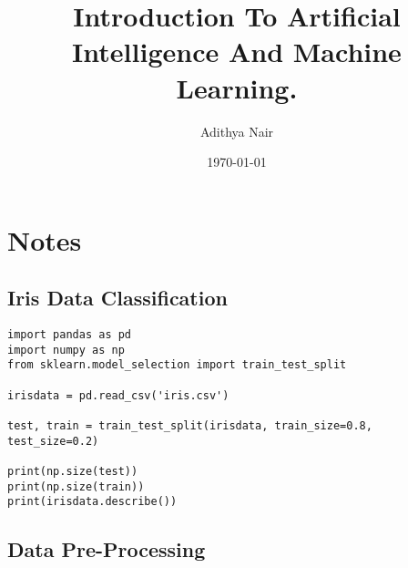 \documentclass[11pt]{article}
\author{Adithya Nair}
\date{\today}
\title{Introduction To Artificial Intelligence And Machine Learning.}
\begin{document}
\maketitle
\tableofcontents

\section{Notes}
\label{sec:orgd99bf65}
\subsection{Iris Data Classification}
\label{sec:org38c2257}
\begin{verbatim}
import pandas as pd
import numpy as np
from sklearn.model_selection import train_test_split

irisdata = pd.read_csv('iris.csv')

test, train = train_test_split(irisdata, train_size=0.8, test_size=0.2)

print(np.size(test))
print(np.size(train))
print(irisdata.describe())
\end{verbatim}
\subsection{Data Pre-Processing}
\label{sec:orgb14d0a6}
\end{document}
